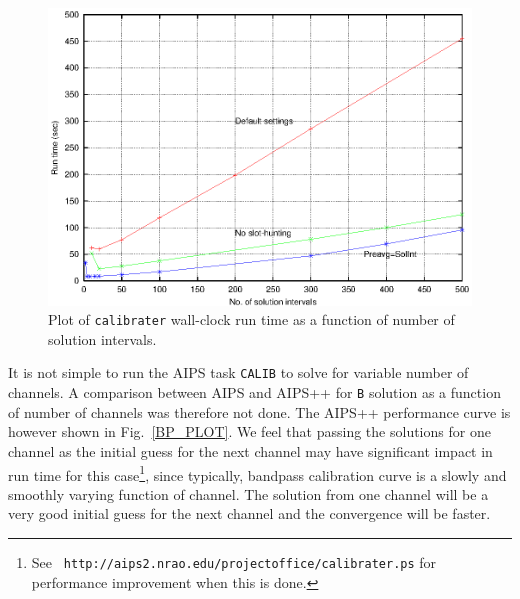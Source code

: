 \begin{figure}[h!]
\begin{center}
  \includegraphics[scale=0.9]{calib.ps}
\caption[AIPS++ {\tt calibrater} performance]{\small Plot of {\tt calibrater}
wall-clock run time as a function of number of solution intervals.}
\label{CALIB_PLOT}
\end{center}
\end{figure}

It is not simple to run the AIPS task {\tt CALIB} to solve for
variable number of channels.  A comparison between AIPS and AIPS++ for
{\tt B} solution as a function of number of channels was therefore not
done.  The AIPS++ performance curve is however shown in
Fig.~\ref{BP_PLOT}.  We feel that passing the solutions for one
channel as the initial guess for the next channel may have significant
impact in run time for this case\footnote{See {\tt
http://aips2.nrao.edu/projectoffice/calibrater.ps} for performance
improvement when this is done.}, since typically, bandpass calibration
curve is a slowly and smoothly varying function of channel.  The
solution from one channel will be a very good initial guess for the
next channel and the convergence will be faster.

